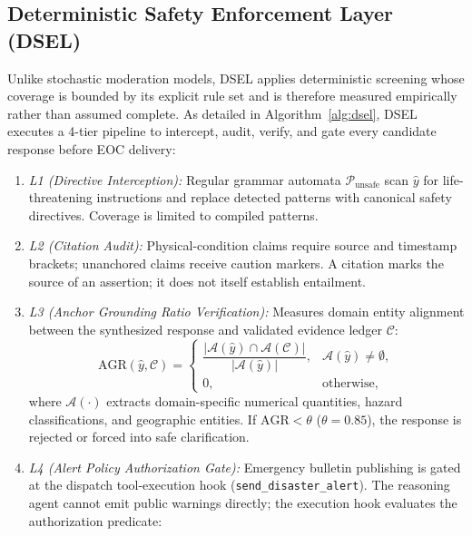 \documentclass[conference]{IEEEtran}
\begin{document}
\subsection{Deterministic Safety Enforcement Layer (DSEL)}
Unlike stochastic moderation models, DSEL applies deterministic screening whose coverage is bounded by its explicit rule set and is therefore measured empirically rather than assumed complete. As detailed in Algorithm~\ref{alg:dsel}, DSEL executes a 4-tier pipeline to intercept, audit, verify, and gate every candidate response before EOC delivery:
\begin{enumerate}
    \item \textit{L1 (Directive Interception):} Regular grammar automata $\mathcal{P}_{\mathrm{unsafe}}$ scan $\hat{y}$ for life-threatening instructions and replace detected patterns with canonical safety directives. Coverage is limited to compiled patterns.
    \item \textit{L2 (Citation Audit):} Physical-condition claims require source and timestamp brackets; unanchored claims receive caution markers. A citation marks the source of an assertion; it does not itself establish entailment.
    \item \textit{L3 (Anchor Grounding Ratio Verification):} Measures domain entity alignment between the synthesized response and validated evidence ledger $\mathcal{C}$:
    \begin{equation}
    \mathrm{AGR}(\hat{y}, \mathcal{C}) =
    \begin{cases}
    \dfrac{|\mathcal{A}(\hat{y}) \cap \mathcal{A}(\mathcal{C})|}{|\mathcal{A}(\hat{y})|}, & \mathcal{A}(\hat{y}) \neq \emptyset,\\[6pt]
    0, & \text{otherwise,}
    \end{cases}
    \label{eq:agr}
    \end{equation}
    where $\mathcal{A}(\cdot)$ extracts domain-specific numerical quantities, hazard classifications, and geographic entities. If $\mathrm{AGR} < \theta$ ($\theta = 0.85$), the response is rejected or forced into safe clarification.
    \item \textit{L4 (Alert Policy Authorization Gate):} Emergency bulletin publishing is gated at the dispatch tool-execution hook (\texttt{send\_disaster\_alert}). The reasoning agent cannot emit public warnings directly; the execution hook evaluates the authorization predicate:
    \begin{equation}
    \label{eq:auth}
    \begin{aligned}

\end{aligned}
\end{equation}
\end{enumerate}
\end{document}
